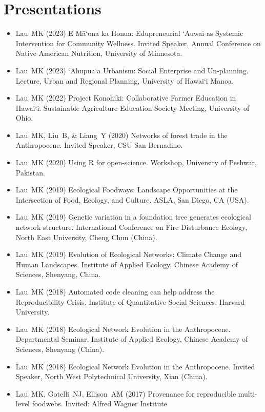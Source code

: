 \documentclass[a4paper]{article}
\begin{document}
\section{Presentations}\label{presentations}

\begin{itemize}
\item Lau~MK (2023) E M\={a}‘ona ka Honua: Edupreneurial ‘Auwai as
  Systemic Intervention for Community Wellness. Invited Speaker,
  Annual Conference on Native American Nutrition, University of Minnesota. 
\item Lau~MK (2023) ‘Ahupua‘a Urbanism: Social Enterprise and
  Un-planning. Lecture, Urban and Regional Planning, University of
  Hawai‘i Manoa.  
\item Lau~MK (2022) Project Konohiki: Collaborative Farmer Education
  in Hawai‘i. Sustainable Agriculture Education Society
  Meeting, University of Ohio. 
\item Lau~MK, Liu~B, \& Liang~Y (2020) Networks of forest trade in the
  Anthropocene. Invited Speaker, CSU San Bernadino.
\item Lau~MK (2020) Using R for open-science. Workshop, University of
  Peshwar, Pakistan. 
\item Lau~MK (2019) Ecological Foodways: Landscape Opportunities at
  the Intersection of Food, Ecology, and Culture. ASLA, San Diego, CA
  (USA).
\item Lau~MK (2019) Genetic variation in a foundation tree generates
  ecological network structure. International Conference on Fire
  Disturbance Ecology, North East University, Cheng Chun (China).
\item Lau~MK (2019) Evolution of Ecological Networks: Climate Change
  and Human Landscapes. Institute of Applied Ecology, Chinese Academy
  of Sciences, Shenyang, China.
\item Lau~MK (2018) Automated code cleaning can help address the
  Reproducibility Crisis. Institute of Quantitative Social Sciences,
  Harvard University.
\item Lau~MK (2018) Ecological Network Evolution in the
  Anthropocene. Departmental Seminar, Institute of Applied Ecology,
  Chinese Academy of Sciences, Shenyang (China).
\item Lau~MK (2018) Ecological Network Evolution in the
  Anthropocene. Invited Speaker, North West Polytechnical University,
  Xian (China).
\item Lau~MK, Gotelli~NJ, Ellison~AM (2017) Provenance for
  reproducible multi-level foodwebs. Invited: Alfred Wagner Institute

\end{itemize}
\end{document}
